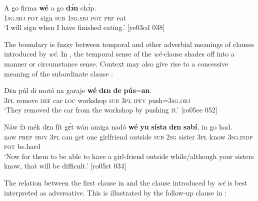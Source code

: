 \ea%
    \label{ex:key:1462}
    \gll A    go  firma  \textbf{wé}  a  go  \textbf{dɔ́n}  chɔ́p.\\
\textsc{1sg.sbj}  \textsc{pot}  sign  \textsc{sub}  \textsc{1sg.sbj}  \textsc{pot}  \textsc{prf}  eat\\

\glt ‘I will sign when I have finished eating.’ [ye03cd 038]
\z

The boundary is fuzzy between temporal and other adverbial meanings of clauses introduced by \textit{wé}. In , the temporal sense of the \textit{wé}{}-clause shades off into a manner or circumstance sense. Context may also give rise to a concessive meaning of the subordinate clause : 


\ea%
    \label{ex:key:1463}
    \gll Dɛn  púl    di  motó  na  garaje    \textbf{wé}  \textbf{dɛn}  \textbf{de}  \textbf{pús}=\textbf{an}.\\
\textsc{3pl}  remove  \textsc{def}  car    \textsc{loc}  workshop  \textsc{sub}  \textsc{3pl}  \textsc{ipfv}  push=\textsc{3sg.obj}\\

\glt ‘They removed the car from the workshop by pushing it.’ [ro05ee 052]
\z


\ea%
    \label{ex:key:1464}
    \gll Náw    fɔ  mék    dɛn  fít  gɛ́t  wán    amiga    nadó  \textbf{wé}  \textbf{yu}
\textbf{sísta}  \textbf{dɛn}  \textbf{sabí},  in    go  had.\\
now    \textsc{prep}  \textsc{sbjv}    \textsc{3pl}  can  get  one    girlfriend  outside  \textsc{sub}  \textsc{2sg}
sister  \textsc{3pl}  know  \textsc{3sg.indp}  \textsc{pot}  be.hard\\

\glt ‘Now for them to be able to have a girl-friend outside while/although 
your sisters know, that will be difficult.’ [ro05rt 034]
\z

The relation between the first clause in  and the clause introduced by \textit{wé} is best interpreted as adversative. This is illustrated by the follow-up clause in :


\ea%
    \label{ex:key:1465}
\z\z

